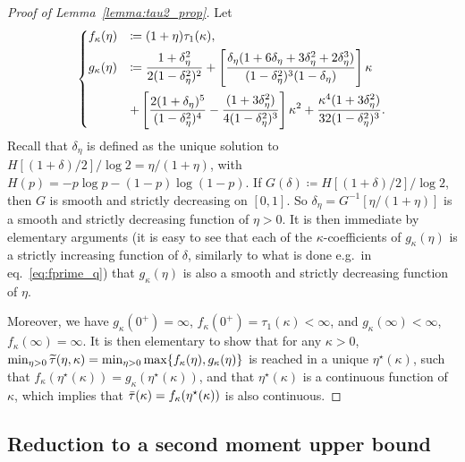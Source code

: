 \begin{proof}[Proof of Lemma~\ref{lemma:tau2_prop}]
Let 
\begin{equation*}
    \begin{dcases}
    f_\kappa(\eta) &\coloneqq (1+\eta) \tau_1(\kappa), \\
    g_\kappa(\eta) &\coloneq \frac{1+\delta_\eta^2}{2(1-\delta_\eta^2)^2}
    + \left[\frac{\delta_\eta(1+6\delta_\eta+3\delta_\eta^2+2\delta_\eta^3)}{(1-\delta_\eta^2)^3(1-\delta_\eta)}\right] \kappa \\
    &
    + \left[ \frac{2(1+\delta_\eta)^5}{(1-\delta_\eta^2)^4} - \frac{(1+3 \delta_\eta^2)}{4(1-\delta_\eta^2)^3}\right] \kappa^2 
      + \frac{\kappa^4(1+3\delta_\eta^2)}{32(1-\delta_\eta^2)^3}.
    \end{dcases}
\end{equation*}
Recall that $\delta_\eta$ is defined as the unique solution to $H[(1+\delta)/2]/\log 2 = \eta / (1+\eta)$, 
with $H(p) = -p \log p - (1-p) \log(1-p)$.
If $G(\delta) \coloneqq H[(1+\delta)/2]/\log 2$, then
$G$ is smooth and strictly decreasing on $[0,1]$. 
So $\delta_\eta = G^{-1}[\eta / (1+\eta)]$ is a smooth and strictly decreasing function of $\eta > 0$.
It is then immediate by elementary arguments (it is easy to see that each of the $\kappa$-coefficients of $g_\kappa(\eta)$ is a strictly increasing function of $\delta$, similarly to what is done e.g.\ in eq.~\eqref{eq:fprime_q}) that 
$g_\kappa(\eta)$ is also a smooth and strictly decreasing function of $\eta$.

\myskip
Moreover, we have $g_\kappa(0^+) = \infty$, $f_\kappa(0^+) = \tau_1(\kappa) < \infty$, and $g_\kappa(\infty) < \infty$, $f_\kappa(\infty) = \infty$.
It is then elementary to show that for any $\kappa > 0$, $\min_{\eta > 0} {\widetilde{\tau}}(\eta, \kappa) = \min_{\eta > 0} \max\{f_\kappa(\eta), g_\kappa(\eta)\}$ 
is reached in a unique $\eta^\star(\kappa)$, such that $f_\kappa(\eta^\star(\kappa)) = g_\kappa(\eta^\star(\kappa))$, and that 
$\eta^\star(\kappa)$ is a continuous function of $\kappa$, which implies that ${\bar{\tau}}(\kappa) = f_\kappa(\eta^\star(\kappa))$ is also continuous.
\end{proof}

\subsection{Reduction to a second moment upper bound}\label{subsec:reduction_2nd_moment_ub}

